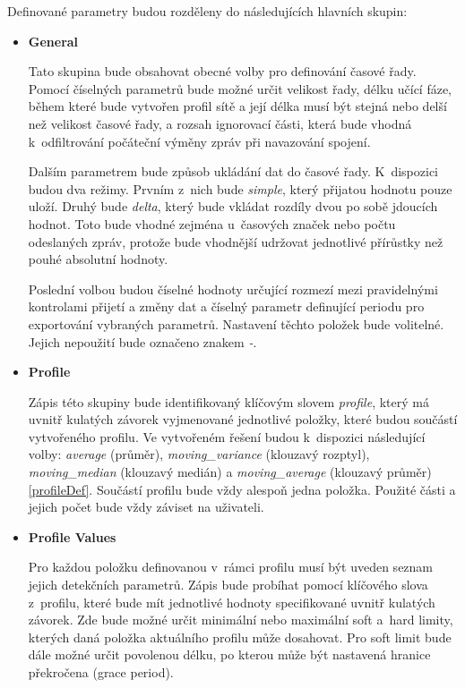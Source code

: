  
 Definované parametry budou rozděleny do následujících hlavních skupin:
 \begin{itemize}
  \item \textbf{General} 
  
  Tato skupina bude obsahovat obecné volby pro definování časové řady. Pomocí číselných parametrů 
  bude možné určit velikost řady, délku učící fáze, během které bude vytvořen profil sítě a její délka
  musí být stejná nebo delší než velikost časové řady, a rozsah ignorovací části, která bude vhodná
  k~odfiltrování počáteční výměny zpráv při navazování spojení. 
  
  Dalším parametrem bude způsob 
  ukládání dat do časové řady. K~dispozici budou dva režimy. Prvním z~nich bude \textit{simple},
  který přijatou
  hodnotu pouze uloží. Druhý bude \textit{delta}, který bude vkládat rozdíly dvou po
  sobě jdoucích hodnot. 
  Toto bude vhodné zejména u~časových značek nebo počtu odeslaných zpráv, protože bude vhodnější 
  udržovat jednotlivé přírůstky než pouhé absolutní hodnoty. 
  
  Poslední volbou budou číselné hodnoty určující rozmezí mezi pravidelnými kontrolami
  přijetí a změny dat a 
  číselný parametr definující periodu pro exportování vybraných parametrů. Nastavení těchto položek
  bude volitelné. Jejich nepoužití bude označeno znakem \textit{-}.
  
  \item \textbf{Profile}
  
  Zápis této skupiny bude identifikovaný klíčovým slovem \textit{profile}, který má uvnitř kulatých závorek 
  vyjmenované jednotlivé položky, které budou součástí vytvořeného profilu. Ve vytvořeném řešení 
  budou k~dispozici následující volby: \textit{average} (průměr), \textit{moving\_variance} (klouzavý rozptyl), 
  \textit{moving\_median} (klouzavý medián) a \textit{moving\_average} (klouzavý průměr) \ref{profileDef}.
  Součástí profilu bude vždy alespoň
  jedna položka. Použité části a jejich počet bude vždy záviset na uživateli.
  
  \item \textbf{Profile Values}
  
  Pro každou položku definovanou v~rámci profilu musí být uveden seznam jejich detekčních parametrů.
  Zápis bude probíhat pomocí klíčového slova z~profilu, které bude mít jednotlivé hodnoty 
  specifikované uvnitř kulatých závorek. Zde bude možné určit minimální nebo maximální soft a~hard
  limity, kterých daná položka aktuálního profilu může dosahovat. Pro soft limit bude dále možné 
  určit povolenou délku, po kterou může být nastavená hranice překročena (grace period). 
  

\end{itemize}
